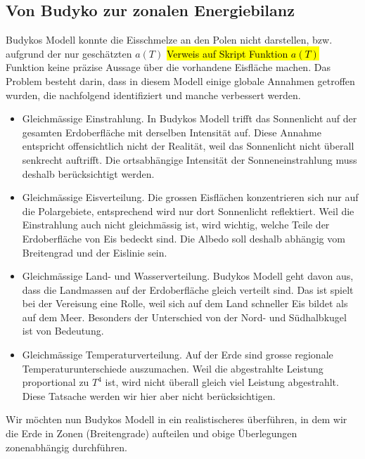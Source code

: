 \begin{refsection}
\section{Von Budyko zur zonalen Energiebilanz}
Budykos Modell konnte die Eisschmelze an den Polen nicht darstellen, bzw. aufgrund der nur geschätzten $a(T)$ \hl{Verweis auf Skript Funktion $a(T)$} Funktion keine präzise Aussage über die vorhandene Eisfläche machen. Das Problem besteht darin, dass in diesem Modell einige globale Annahmen getroffen wurden, die nachfolgend identifiziert und manche verbessert werden.
\begin{itemize}
	\item Gleichmässige Einstrahlung. In Budykos Modell trifft das Sonnenlicht auf der gesamten Erdoberfläche mit derselben Intensität auf. Diese Annahme entspricht offensichtlich nicht der Realität, weil das Sonnenlicht nicht überall senkrecht auftrifft. Die ortsabhängige Intensität der Sonneneinstrahlung muss deshalb berücksichtigt werden.
	\item Gleichmässige Eisverteilung. Die grossen Eisflächen konzentrieren sich nur auf die Polargebiete, entsprechend wird nur dort Sonnenlicht reflektiert. Weil die Einstrahlung auch nicht gleichmässig ist, wird wichtig, welche Teile der Erdoberfläche von Eis bedeckt sind. Die Albedo soll deshalb abhängig vom Breitengrad und der Eislinie sein.
	\item Gleichmässige Land- und Wasserverteilung. Budykos Modell geht davon aus, dass die Landmassen auf der Erdoberfläche gleich verteilt sind. Das ist spielt bei der Vereisung eine Rolle, weil sich auf dem Land schneller Eis bildet als auf dem Meer. Besonders der Unterschied von der Nord- und Südhalbkugel ist von Bedeutung.
	\item Gleichmässige Temperaturverteilung. Auf der Erde sind grosse regionale Temperaturunterschiede auszumachen. Weil die abgestrahlte Leistung proportional zu $T^4$ ist, wird nicht überall gleich viel Leistung abgestrahlt. Diese Tatsache werden wir hier aber nicht berücksichtigen.
\end{itemize}
Wir möchten nun Budykos Modell in ein realistischeres überführen, in dem wir die Erde in Zonen (Breitengrade) aufteilen und obige Überlegungen zonenabhängig durchführen.

\end{refsection}
